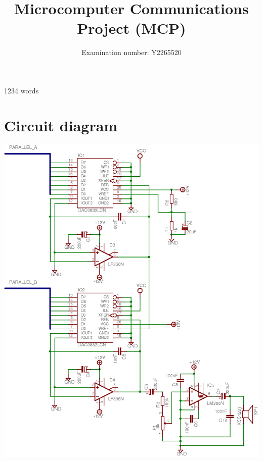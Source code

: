 \documentclass[10pt]{article}
\title{Microcomputer Communications Project (MCP)}
\author{Examination number: Y2265520}
\newif\ifnotwc\notwctrue
\begin{document}
\ifnotwc

\maketitle
\begin{center}
1234 words
\end{center}
\newpage
\tableofcontents

\fi %








\ifnotwc

\appendix

\section{Circuit diagram}
\begin{center}
\label{appendix:circuit_diagram}
\includegraphics[totalheight=0.92\textheight]{images/output-schematic.png}
\end{center}
\end{document}

